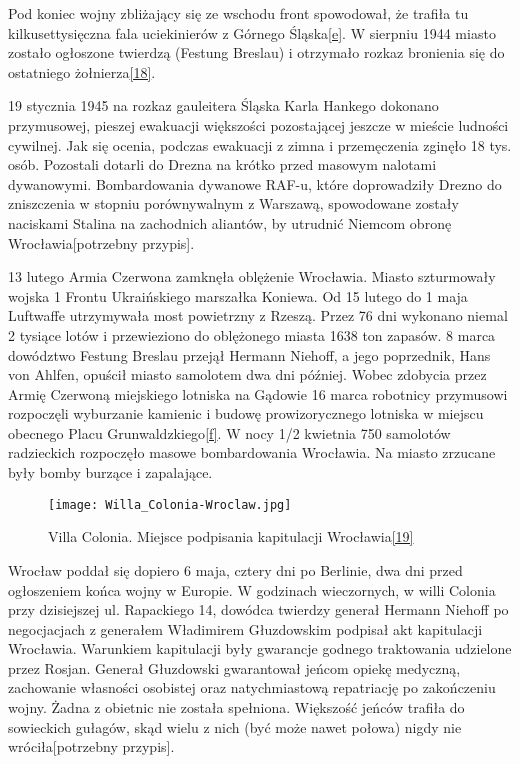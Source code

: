 \documentclass{article}
\begin{document}
Pod koniec wojny zbliżający się ze wschodu front spowodował, że trafiła tu kilkusettysięczna fala uciekinierów z Górnego Śląska\hyperref[e]{[e]}. W sierpniu 1944 miasto zostało ogłoszone twierdzą (Festung Breslau) i otrzymało rozkaz bronienia się do ostatniego żołnierza\hyperref[18]{[18]}.

19 stycznia 1945 na rozkaz gauleitera Śląska Karla Hankego dokonano przymusowej, pieszej ewakuacji większości pozostającej jeszcze w mieście ludności cywilnej. Jak się ocenia, podczas ewakuacji z zimna i przemęczenia zginęło 18 tys. osób. Pozostali dotarli do Drezna na krótko przed masowym nalotami dywanowymi. Bombardowania dywanowe RAF-u, które doprowadziły Drezno do zniszczenia w stopniu porównywalnym z Warszawą, spowodowane zostały naciskami Stalina na zachodnich aliantów, by utrudnić Niemcom obronę Wrocławia[potrzebny przypis].

13 lutego Armia Czerwona zamknęła oblężenie Wrocławia. Miasto szturmowały wojska 1 Frontu Ukraińskiego marszałka Koniewa. Od 15 lutego do 1 maja Luftwaffe utrzymywała most powietrzny z Rzeszą. Przez 76 dni wykonano niemal 2 tysiące lotów i przewieziono do oblężonego miasta 1638 ton zapasów. 8 marca dowództwo Festung Breslau przejął Hermann Niehoff, a jego poprzednik, Hans von Ahlfen, opuścił miasto samolotem dwa dni później. Wobec zdobycia przez Armię Czerwoną miejskiego lotniska na Gądowie 16 marca robotnicy przymusowi rozpoczęli wyburzanie kamienic i budowę prowizorycznego lotniska w miejscu obecnego Placu Grunwaldzkiego\hyperref[f]{[f]}. W nocy 1/2 kwietnia 750 samolotów radzieckich rozpoczęło masowe bombardowania Wrocławia. Na miasto zrzucane były bomby burzące i zapalające.

\begin{wrapfigure}{r}{0.42\textwidth} 
\begin{center}
\vspace{-20pt}
\texttt{[image: Willa\_Colonia-Wroclaw.jpg]}
\end{center}
\vspace{-20pt}
\caption{Villa Colonia. Miejsce podpisania kapitulacji Wrocławia\hyperref[19]{[19]}}
\vspace{-10pt}
\end{wrapfigure}

Wrocław poddał się dopiero 6 maja, cztery dni po Berlinie, dwa dni przed ogłoszeniem końca wojny w Europie. W godzinach wieczornych, w willi Colonia przy dzisiejszej ul. Rapackiego 14, dowódca twierdzy generał Hermann Niehoff po negocjacjach z generałem Władimirem Głuzdowskim podpisał akt kapitulacji Wrocławia. Warunkiem kapitulacji były gwarancje godnego traktowania udzielone przez Rosjan. Generał Głuzdowski gwarantował jeńcom opiekę medyczną, zachowanie własności osobistej oraz natychmiastową repatriację po zakończeniu wojny. Żadna z obietnic nie została spełniona. Większość jeńców trafiła do sowieckich gułagów, skąd wielu z nich (być może nawet połowa) nigdy nie wróciła[potrzebny przypis].
\end{document}
